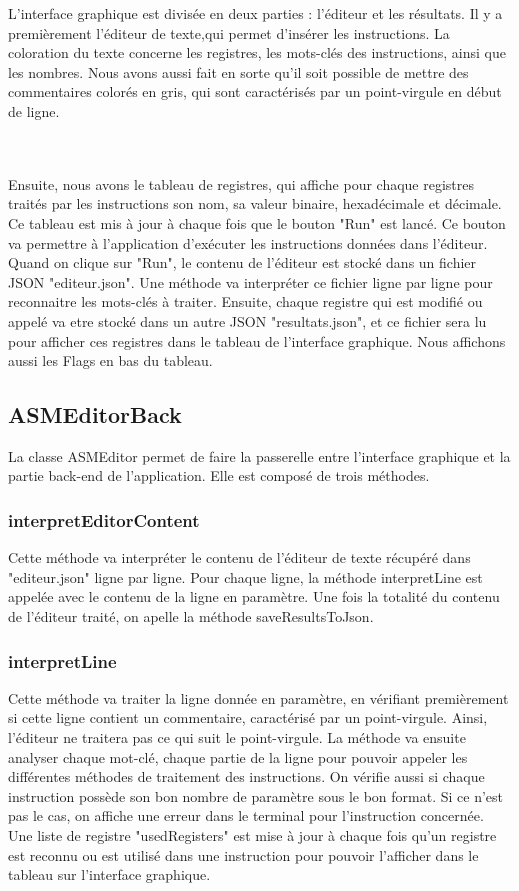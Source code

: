 \documentclass{article}
\begin{document}
L'interface graphique est divisée en deux parties : l'éditeur et les résultats.
Il y a premièrement l'éditeur de texte,qui permet d'insérer les instructions.
La coloration du texte concerne les registres, les mots-clés des instructions, ainsi que les nombres.
Nous avons aussi fait en sorte qu'il soit possible de mettre des commentaires colorés en gris, qui sont caractérisés par un point-virgule en début de ligne.

\\
\\
Ensuite, nous avons le tableau de registres, qui affiche pour chaque registres traités par les instructions son nom, sa valeur binaire, hexadécimale et décimale.
Ce tableau est mis à jour à chaque fois que le bouton "Run" est lancé.
Ce bouton va permettre à l'application d'exécuter les instructions données dans l'éditeur.
Quand on clique sur "Run", le contenu de l'éditeur est stocké dans un fichier JSON "editeur.json".
Une méthode va interpréter ce fichier ligne par ligne pour reconnaitre les mots-clés à traiter.
Ensuite, chaque registre qui est modifié ou appelé va etre stocké dans un autre JSON "resultats.json", et ce fichier sera lu pour afficher ces registres dans le tableau de l'interface graphique.
Nous affichons aussi les Flags en bas du tableau.

\subsection{ASMEditorBack}

La classe ASMEditor permet de faire la passerelle entre l'interface graphique et la partie back-end de l'application.
Elle est composé de trois méthodes.

\subsubsection{interpretEditorContent}
Cette méthode va interpréter le contenu de l'éditeur de texte récupéré dans "editeur.json" ligne par ligne.
Pour chaque ligne, la méthode interpretLine est appelée avec le contenu de la ligne en paramètre.
Une fois la totalité du contenu de l'éditeur traité, on apelle la méthode saveResultsToJson.

\subsubsection{interpretLine}
Cette méthode va traiter la ligne donnée en paramètre, en vérifiant premièrement si cette ligne contient un commentaire, caractérisé par un point-virgule.
Ainsi, l'éditeur ne traitera pas ce qui suit le point-virgule.
La méthode va ensuite analyser chaque mot-clé, chaque partie de la ligne pour pouvoir appeler les différentes méthodes de traitement des instructions.
On vérifie aussi si chaque instruction possède son bon nombre de paramètre sous le bon format.
Si ce n'est pas le cas, on affiche une erreur dans le terminal pour l'instruction concernée.
Une liste de registre "usedRegisters" est mise à jour à chaque fois qu'un registre est reconnu ou est utilisé dans une instruction pour pouvoir l'afficher dans le tableau sur l'interface graphique.
\end{document}
